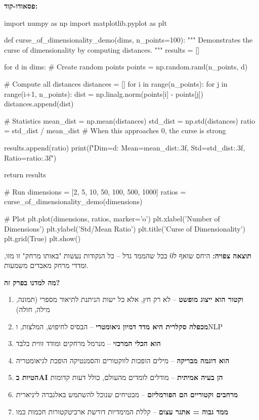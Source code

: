 \textbf{פסאודו-קוד:}

\begin{pythonbox}
import numpy as np
import matplotlib.pyplot as plt

def curse_of_dimensionality_demo(dims, n_points=100):
    """
    Demonstrates the curse of dimensionality by computing distances.
    """
    results = []

    for d in dims:
        # Create random points
        points = np.random.rand(n_points, d)

        # Compute all distances
        distances = []
        for i in range(n_points):
            for j in range(i+1, n_points):
                dist = np.linalg.norm(points[i] - points[j])
                distances.append(dist)

        # Statistics
        mean_dist = np.mean(distances)
        std_dist = np.std(distances)
        ratio = std_dist / mean_dist  # When this approaches 0, the curse is strong

        results.append(ratio)
        print(f"Dim={d}: Mean={mean_dist:.3f}, Std={std_dist:.3f}, Ratio={ratio:.3f}")

    return results

# Run
dimensions = [2, 5, 10, 50, 100, 500, 1000]
ratios = curse_of_dimensionality_demo(dimensions)

# Plot
plt.plot(dimensions, ratios, marker='o')
plt.xlabel('Number of Dimensions')
plt.ylabel('Std/Mean Ratio')
plt.title('Curse of Dimensionality')
plt.grid(True)
plt.show()
\end{pythonbox}

\textbf{תוצאה צפויה:} היחס שואף ל\en{-}\num{0} ככל שהממד גדל – כל הנקודות נעשות "באותו מרחק" זו מזו, ומדדי מרחק מאבדים משמעות.


\textbf{מה למדנו בפרק זה?}

\begin{enumerate}
\item \textbf{וקטור הוא ייצוג מופשט} – לא רק חץ, אלא כל ישות הניתנת לתיאור מספרי (תמונה, מילה, חולה)
\item \textbf{מכפלה סקלרית היא מדד דמיון גיאומטרי} – הבסיס לחיפוש, המלצות, ו\en{-}NLP
\item \textbf{ הוא הכלי המרכזי} – מנרמל מרחקים ומודד זווית בלבד
\item \textbf{ הוא דוגמה מבריקה} – מילים הופכות לווקטורים והסמנטיקה הופכת לגיאומטריה
\item \textbf{הטיות ב\en{-}AI הן בעיה אמיתית} – מודלים לומדים מהעולם, כולל דעות קדומות
\item \textbf{מרחבים וקטוריים הם הפורמליזם} – מבטיחים שנוכל להשתמש באלגברה ליניארית
\item \textbf{ממד גבוה = אתגר עצום} – קללת המימדיות דורשת ארכיטקטורות חכמות כמו 
\end{enumerate}

